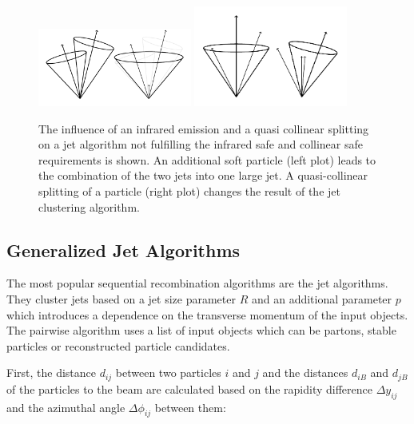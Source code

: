 \begin{figure}[htbp]
    \centering
    \includegraphics[width=0.45\textwidth]{figures/drawings/infrared_safety/jetinfrared.pdf}\hfill
    \includegraphics[width=0.45\textwidth]{figures/drawings/infrared_safety/jetcollinear.pdf}
    \caption[Effect of infrared emissions and collinear splittings on jet
    algorithms]{The influence of an infrared emission and a quasi
        collinear splitting on a jet algorithm not fulfilling the infrared safe
        and collinear safe requirements is shown. An additional soft particle (left plot)
    leads to the combination of the two jets into one large jet. A
quasi-collinear splitting of a particle (right plot) changes the result of the
jet clustering algorithm.}
    \label{fig:infrared_safety}
\end{figure}

\subsection{Generalized \kt Jet Algorithms}

The most popular sequential recombination algorithms are the \kt jet
algorithms. They cluster jets based on a jet size parameter $R$ and an
additional parameter $p$ which introduces a dependence on the transverse momentum of
the input objects. The pairwise algorithm uses a list of input objects which
can be partons, stable particles or reconstructed particle candidates.

First, the distance $d_{ij}$ between two particles $i$ and $j$ and the distances
$d_{iB}$ and $d_{jB}$ of the particles to the beam are calculated based on the
rapidity difference $\Delta y_{ij}$ and the azimuthal angle $\Delta \phi_{ij}$
between them:

